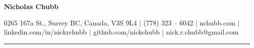 %
%

\begin{center}

{\Huge \textbf{Nicholas Chubb}}

\vspace{1em}


{\small
{{ }\faHome { }6265 167a St., Surrey BC, Canada, V3S 9L4} $|$ 
{{ }\faPhoneSquare { } (778) 323 -- 6042} $|$ 
{{ }\faUser { } nchubb.com} $|$ \\
\vspace{.3em}
{{ }\faLinkedinSquare { } linkedin.com/in/nickrchubb} $|$ 
{{ }\faGithub { } github.com/nickchubb} $|$ 
{{ }\faEnvelope { } nick.r.chubb@gmail.com}\\ \vspace{.2em}
}

\end{center}

\hrule

\vspace{-0.4em}